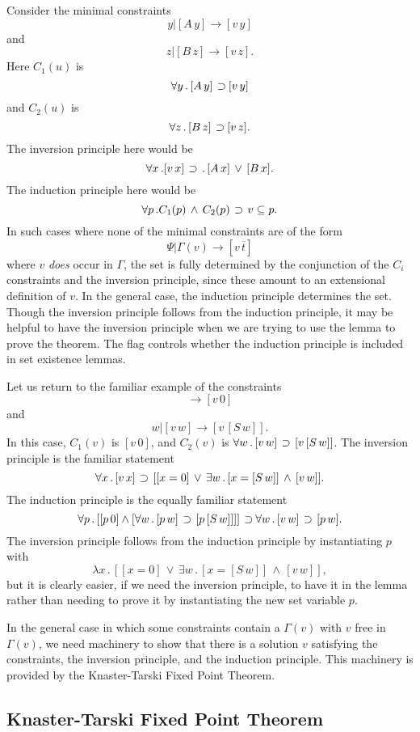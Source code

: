 Consider the minimal constraints
$$y | [A\, y] \rightarrow [v\, y]$$
and
$$z | [B\, z] \rightarrow [v\, z].$$
Here $C_1(u)$ is 
$$\forall y \, . \, [A\, y]\, \mathbin{\supset} [v\, y]$$
and $C_2(u)$ is
$$\forall z \, . \, [B\, z]\, \mathbin{\supset} [v\, z].$$
The inversion principle here would be
$$\forall x\, . [v\, x]\, \mathbin{\supset}\, .\,[A\, x]\, \lor\, [B\, x].$$
The induction principle here would be
$$\forall p\, . C_1(p)\,\land\, C_2(p)\,\mathbin{\supset}\, v\subseteq p.$$
In such cases where none of the minimal constraints are of the
form
$$\Psi | \Gamma(v) \rightarrow [v\, \overline{t}]$$
where $v$ {\it does} occur in $\Gamma$,
the set is fully determined by the conjunction of the
$C_i$ constraints and the inversion principle, since these
amount to an extensional definition of $v$.
In the general case, the induction principle determines the set.
Though the inversion principle follows from the induction principle,
it may be helpful to have the inversion principle when we are
trying to use the lemma to prove the theorem.
The flag  controls
whether the induction principle is included in set existence lemmas.%

Let us return to the familiar example of the constraints
$$\rightarrow [v\, 0]$$
and
$$w | [v\, w] \rightarrow [v\, [S\, w]].$$
In this case, $C_1(v)$ is $[v\, 0]$, and $C_2(v)$ is
$\forall w\,.\, [v\, w]\,\mathbin{\supset}\, [v\, [S\, w]]$.
The inversion principle is the familiar statement
$$\forall x\,.\, [v\, x]\,\mathbin{\supset}\, [[x = 0]\, \lor\,
\exists w\,.\, [x = [S\, w]]\,\land\, [v\, w]].$$
The induction principle is the equally familiar statement
$$\forall p\,.\, [[p\, 0] \land [\forall w\,.\, [p\, w]\,\mathbin{\supset}\, [p\, [S\, w]]]]\,
\mathbin{\supset} \forall w \, .\, [v\, w]\,\mathbin{\supset}\, [p\, w].$$
The inversion principle follows from the induction principle
by instantiating $p$ with
$$\lambda x\,.\, [[x = 0]\, \lor\,
\exists w\,.\, [x = [S\, w]]\,\land\, [v\, w]],$$
but it is clearly easier, if we need the inversion principle,
to have it in the lemma rather than needing to prove it
by instantiating the new set variable $p$.

In the general case in which some constraints
contain a $\Gamma(v)$ with $v$ free in $\Gamma(v)$,
we need machinery to show that there is a solution $v$
satisfying the constraints, the inversion principle,
and the induction principle.  This machinery is provided
by the Knaster-Tarski Fixed Point Theorem.

\subsection{Knaster-Tarski Fixed Point Theorem}\label{knaster-tarski}

